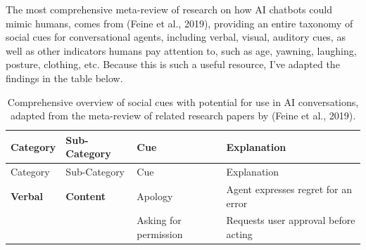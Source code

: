 \documentclass[
  letterpaper,
  DIV=11,
  numbers=noendperiod]{scrartcl}
\begin{document}
The most comprehensive meta-review of research on how AI chatbots could
mimic humans, comes from (Feine et al., 2019), providing an entire
taxonomy of social cues for conversational agents, including verbal,
visual, auditory cues, as well as other indicators humans pay attention
to, such as age, yawning, laughing, posture, clothing, etc. Because this
is such a useful resource, I've adapted the findings in the table below.

\begin{longtable}[]{@{}
  >{\raggedright\arraybackslash}p{}
  >{\raggedright\arraybackslash}p{}
  >{\raggedright\arraybackslash}p{}
  >{\raggedright\arraybackslash}p{}@{}}
\caption{Comprehensive overview of social cues with potential for use in
AI conversations, adapted from the meta-review of related research
papers by (Feine et al., 2019).}\tabularnewline
\toprule\noalign{}
\begin{minipage}[b]{\linewidth}\raggedright
Category
\end{minipage} & \begin{minipage}[b]{\linewidth}\raggedright
Sub-Category
\end{minipage} & \begin{minipage}[b]{\linewidth}\raggedright
Cue
\end{minipage} & \begin{minipage}[b]{\linewidth}\raggedright
Explanation
\end{minipage} \\
\midrule\noalign{}
\endfirsthead
\toprule\noalign{}
\begin{minipage}[b]{\linewidth}\raggedright
Category
\end{minipage} & \begin{minipage}[b]{\linewidth}\raggedright
Sub-Category
\end{minipage} & \begin{minipage}[b]{\linewidth}\raggedright
Cue
\end{minipage} & \begin{minipage}[b]{\linewidth}\raggedright
Explanation
\end{minipage} \\
\midrule\noalign{}
\endhead
\bottomrule\noalign{}
\endlastfoot
\textbf{Verbal} & \textbf{Content} & Apology & Agent expresses regret
for an error \\
& & Asking for permission & Requests user approval before acting \\

\end{longtable}
\end{document}

